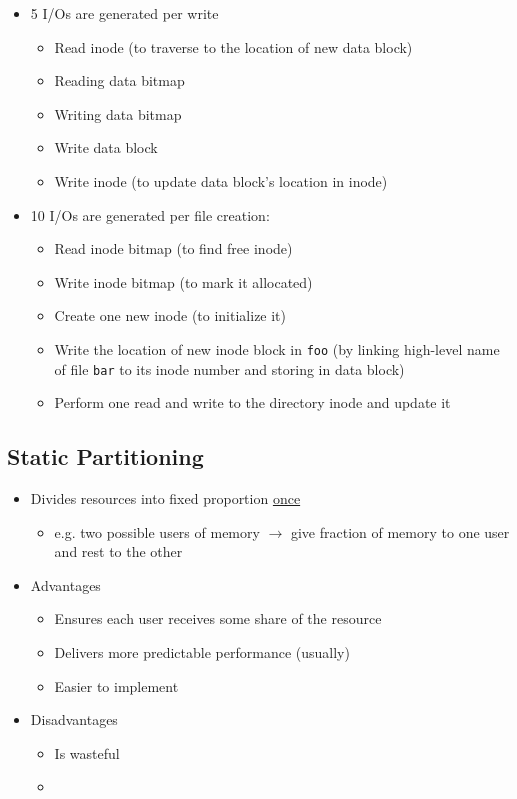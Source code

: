 \documentclass[12pt]{article}
\begin{document}
\begin{itemize}
    \item 5 I/Os are generated per write

    \begin{itemize}
        \item Read inode (to traverse to the location of new data block)
        \item Reading data bitmap
        \item Writing data bitmap
        \item Write data block
        \item Write inode (to update data block's location in inode)
    \end{itemize}
    \item 10 I/Os are generated per file creation:

    \begin{itemize}
        \item Read inode bitmap (to find free inode)
        \item Write inode bitmap (to mark it allocated)
        \item Create one new inode (to initialize it)
        \item Write the location of new inode block in \texttt{foo} (by linking high-level name of file \texttt{bar} to its inode number and storing in data block)
        \item Perform one read and write to the directory inode and update it
    \end{itemize}
\end{itemize}

\subsection{Static Partitioning}

\begin{itemize}
    \item Divides resources into fixed proportion \underline{once}
    \begin{itemize}
        \item e.g. two possible users of memory $\to$ give fraction of memory to one user and
        rest to the other
    \end{itemize}
    \item Advantages
    \begin{itemize}
        \item Ensures each user receives some share of the resource
        \item Delivers more predictable performance (usually)
        \item Easier to implement
    \end{itemize}
    \item Disadvantages
    \begin{itemize}
        \item Is wasteful
        \item
    \end{itemize}
\end{itemize}
\end{document}
